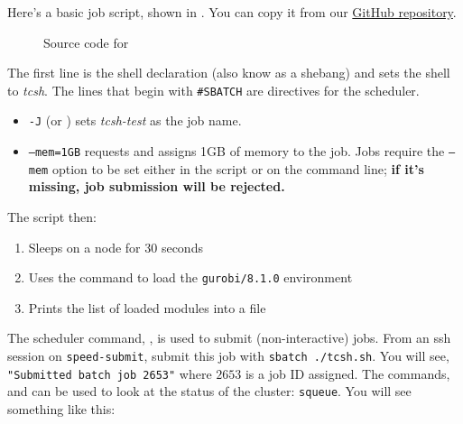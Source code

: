 Here's a basic job script,  shown in .
You can copy it from our \href{https://github.com/NAG-DevOps/speed-hpc}{GitHub repository}.

\begin{figure}[htpb]
	
	\caption{Source code for }
	\label{fig:tcsh.sh}
\end{figure}

\noindent The first line is the shell declaration (also know as a shebang) and sets the shell to \emph{tcsh}.
The lines that begin with \texttt{\#SBATCH} are directives for the scheduler.
\begin{itemize}
	\item \texttt{-J} (or ) sets \emph{tcsh-test} as the job name.
	\item \texttt{--mem=1GB} requests and assigns 1GB of memory to the job. 
	Jobs require the \texttt{--mem} option to be set either in the script
	or on the command line; \textbf{if it's missing, job submission will be rejected.}
\end{itemize}

\noindent The script then:
\begin{enumerate}
	\item Sleeps on a node for 30 seconds
	\item Uses the  command to load the \texttt{gurobi/8.1.0} environment
	\item Prints the list of loaded modules into a file
\end{enumerate}

\noindent The scheduler command, , is used to submit (non-interactive) jobs. 
From an ssh session on \texttt{speed-submit}, submit this job with \texttt{sbatch ./tcsh.sh}.
You will see, \texttt{"Submitted batch job 2653"} where $2653$ is a job ID assigned.
The commands,  and  can be used 
to look at the status of the cluster: \texttt{squeue}.
You will see something like this: 

